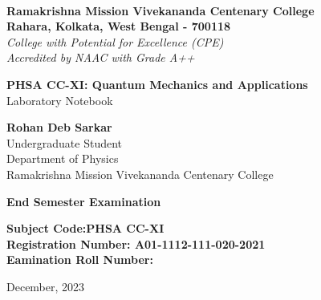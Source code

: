 \begin{titlepage}
    \begin{center}
        \\
        \large\textbf{Ramakrishna Mission Vivekananda Centenary College}\\
        \normalsize\textbf{Rahara, Kolkata, West Bengal - 700118}\\
        \small\slshape College with Potential for Excellence (CPE)\\
        \small\normalfont Accredited by NAAC with Grade A++

        \vfill

        \large\textbf{PHSA CC-XI: Quantum Mechanics and Applications}\\
        \normalsize Laboratory Notebook

        \vfill

        \large\textbf{Rohan Deb Sarkar}\\
        \normalsize Undergraduate Student\\
        \normalsize Department of Physics\\
        \normalsize Ramakrishna Mission Vivekananda Centenary College

        \vfill

        \large \textbf{End Semester Examination}\\

        \vspace{2em}

        \normalsize
        \textbf{Subject Code:\hfill PHSA CC-XI\\
                Registration Number: \hfill A01-1112-111-020-2021\\
                Eamination Roll Number: \hfill \phantom{0000000000}\\
        }
        
        \vfill

        \normalsize December, 2023
    \end{center}
\end{titlepage}